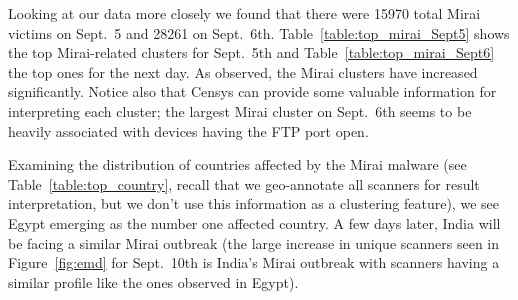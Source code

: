 \documentclass[manuscript, nonacm]{acmart}
\begin{document}
Looking at our data more closely we found that 
there were 15970 total Mirai victims on Sept.\ 5 and 28261 on Sept.\ 6th.
Table~\ref{table:top_mirai_Sept5} shows the top Mirai-related clusters for Sept.\ 5th
and Table~\ref{table:top_mirai_Sept6} the top ones for the next day. As observed,
the Mirai clusters have increased significantly. Notice also
that Censys can provide some valuable information for interpreting each cluster;
the largest Mirai cluster on Sept.\ 6th seems to be heavily associated with devices
having the FTP port open.

Examining the distribution of countries affected by the Mirai malware (see Table~\ref{table:top_country},
recall that we geo-annotate all scanners for result interpretation, but we
don't use this information as a clustering feature), we see Egypt emerging as the number one affected country.
A few days later, India will be facing a similar Mirai outbreak (the large
increase in unique scanners seen in Figure~\ref{fig:emd} for Sept.\ 10th
is India's Mirai outbreak with scanners having a similar profile like the ones observed 
in Egypt).

\begin{table}[htb]
    \centering
    \caption{Top 5 Mirai-related Clusters on Sept.~5, 2020}
    \footnotesize
    \label{table:top_mirai_Sept5}
\end{table}
\end{document}
